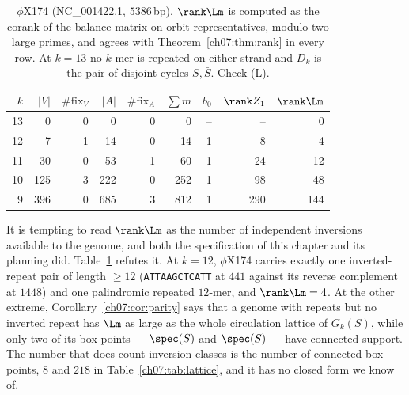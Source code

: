 \begin{table}[t]
\centering
\begin{tabular}{rrrrrrrrr}
\toprule
$k$ & $|V|$ & $\#\mathrm{fix}_V$ & $|A|$ & $\#\mathrm{fix}_A$ & $\sum m$ & $b_0$ &
$\rank Z_1$ & $\rank\Lm$\\
\midrule
13 &   0 & 0 &   0 & 0 &   0 & -- & -- & 0\\
12 &   7 & 1 &  14 & 0 &  14 & 1 &   8 &   4\\
11 &  30 & 0 &  53 & 1 &  60 & 1 &  24 &  12\\
10 & 125 & 3 & 222 & 0 & 252 & 1 &  98 &  48\\
 9 & 396 & 0 & 685 & 3 & 812 & 1 & 290 & 144\\
\bottomrule
\end{tabular}
\caption{$\phi$X174 (NC\_001422.1, $5386$\,bp). $\rank\Lm$ is computed as the corank of the
balance matrix on orbit representatives, modulo two large primes, and agrees with
Theorem~\ref{ch07:thm:rank} in every row. At $k=13$ no $k$-mer is repeated on either strand and
$D_k$ is the pair of disjoint cycles $S,\bar S$. Check (L).}
\label{ch07:tab:rank}
\end{table}

\begin{remark}\label{ch07:rem:notIR}
It is tempting to read $\rank\Lm$ as the number of independent inversions available to the
genome, and both the specification of this chapter and its planning did. Table~\ref{ch07:tab:rank}
refutes it. At $k=12$, $\phi$X174 carries exactly one inverted-repeat pair of length $\ge12$
(\texttt{ATTAAGCTCATT} at $441$ against its reverse complement at $1448$) and one palindromic
repeated $12$-mer, and $\rank\Lm=4$. At the other extreme, Corollary~\ref{ch07:cor:parity} says
that a genome with repeats but no inverted repeat has $\Lm$ as large as the whole circulation
lattice of $G_k(S)$, while only two of its box points --- $\spec(S)$ and $\spec(\bar S)$ ---
have connected support. The number that does count inversion classes is the number of
connected box points, $8$ and $218$ in Table~\ref{ch07:tab:lattice}, and it has no closed form we
know of.
\end{remark}

